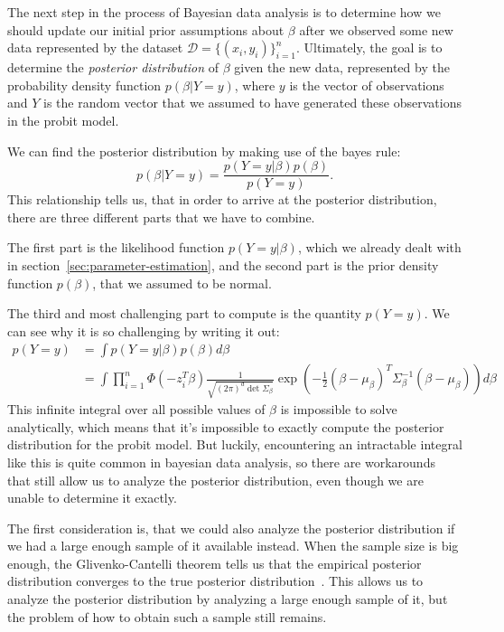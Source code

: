 The next step in the process of Bayesian data analysis
is to determine how we should update our initial prior
assumptions about $\beta$ after we observed some new data
represented by the dataset $\mathcal{D} = \{(x_i, y_i)\}_{i=1}^n$.
Ultimately, the goal is to determine the
\textit{posterior distribution} of $\beta$ given the new data,
represented by the probability density function
$p(\beta | Y=y)$, where $y$ is the
vector of observations and $Y$ is the random vector that we
assumed to have generated these observations in the probit model.

We can find the posterior distribution by making use of the bayes rule:
\begin{equation}
    p(\beta | Y=y) = \frac{p(Y=y | \beta) p(\beta)}{p(Y=y)}.
\end{equation}
This relationship tells us, that in order to arrive at the
posterior distribution, there
are three different parts that we have to combine.

The first part is the likelihood function $p(Y=y|\beta)$,
which we already dealt with in section~\ref{sec:parameter-estimation}, and
the second part is the prior density function $p(\beta)$,
that we assumed to be normal.

The third and most challenging part to compute is the quantity $p(Y=y)$.
We can see why it is so challenging by writing it out:
\begin{equation}
    \begin{split}
        p(Y=y) &= \int p(Y=y|\beta)p(\beta) d\beta \\
        &= \int \prod_{i=1}^n \Phi(- z_i^T \beta)
        \frac{1}{\sqrt{(2\pi)^d \det{\Sigma_\beta}}}
        \exp{\left(-\frac{1}{2}(\beta - \mu_\beta)^T \Sigma_\beta^{-1}(\beta - \mu_\beta)\right)} d\beta
    \end{split}
\end{equation}
This infinite integral over all possible values of $\beta$
is impossible to solve analytically, which means that
it's impossible to exactly compute the posterior distribution
for the probit model.
But luckily, encountering an intractable integral like this
is quite common in bayesian data analysis, so
there are workarounds that still allow us to analyze the
posterior distribution, even though we are unable
to determine it exactly.

The first consideration is, that we could also analyze the posterior
distribution if we had a large enough sample of it available instead.
When the sample size is big enough, the Glivenko-Cantelli theorem
tells us that the empirical posterior distribution converges
to the true posterior distribution~\cite{glivenko-cantelli}.
This allows us to analyze the posterior
distribution by analyzing a large enough sample of it,
but the problem of how to obtain such a sample still remains.

